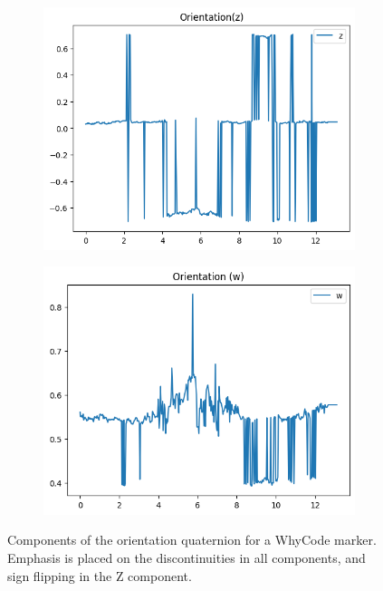 \begin{figure}
\begin{subfigure}[b]{0.49\textwidth}
         \includegraphics[width=\textwidth]{images/orientation_z_figure.png}
    \end{subfigure}
    \hfill
    \begin{subfigure}[b]{0.49\textwidth}
         \centering
         \includegraphics[width=\textwidth]{images/orientation_w_figure.png}
    \end{subfigure}
    \caption{Components of the orientation quaternion for a WhyCode marker. Emphasis is placed on the discontinuities in all components, and sign flipping in the Z component.}
    \label{figure:orientation_flipping}
\end{figure}

